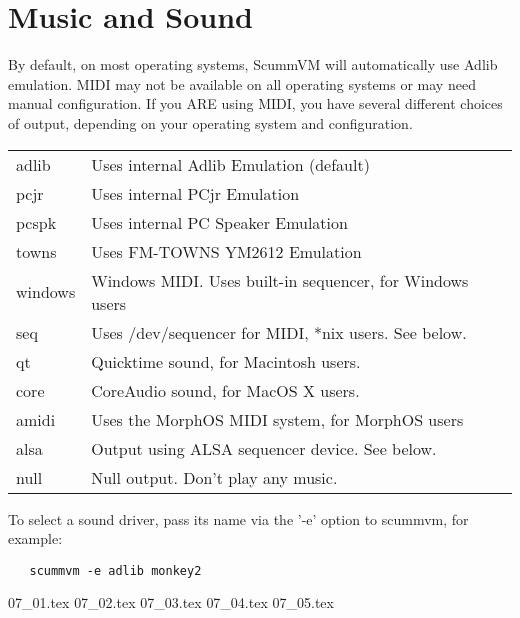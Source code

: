 

\section{Music and Sound}
By default, on most operating systems, ScummVM will automatically use Adlib
emulation. MIDI may not be available on all operating systems or may need
manual configuration. If you ARE using MIDI, you have several different
choices of output, depending on your operating system and configuration.

\begin{tabular}[h]{ll}
  adlib     & Uses internal Adlib Emulation (default)\\
  pcjr      & Uses internal PCjr Emulation \\
  pcspk     & Uses internal PC Speaker Emulation\\
  towns     & Uses FM-TOWNS YM2612 Emulation\\
  windows   & Windows MIDI. Uses built-in sequencer, for Windows users\\
  seq       & Uses /dev/sequencer for MIDI, *nix users. See below.\\
  qt        & Quicktime sound, for Macintosh users.\\
  core      & CoreAudio sound, for MacOS X users.\\
  amidi     & Uses the MorphOS MIDI system, for MorphOS users\\
  alsa      & Output using ALSA sequencer device. See below.\\
  null      & Null output. Don't play any music.\\
\end{tabular}

To select a sound driver, pass its name via the '-e' option to scummvm,
for example:
\begin{verbatim}
   scummvm -e adlib monkey2
\end{verbatim}

 {07_01.tex}
 {07_02.tex}
 {07_03.tex}
 {07_04.tex}
 {07_05.tex}